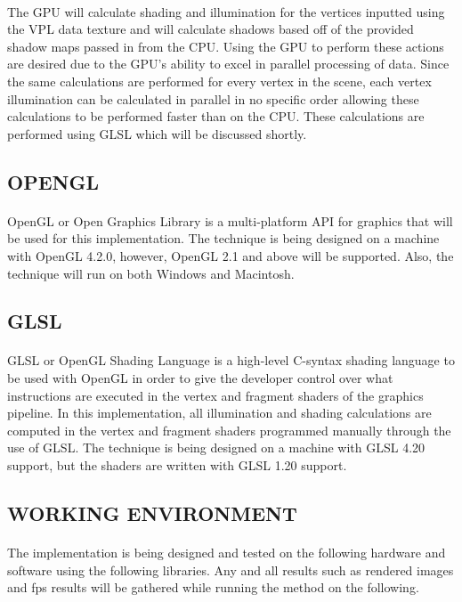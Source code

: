 \paragraph{}
The GPU will calculate shading and illumination for the vertices inputted using the VPL data texture and will calculate shadows based off of the provided shadow maps passed in from the CPU.  Using the GPU to perform these actions are desired due to the GPU's ability to excel in parallel processing of data.  Since the same calculations are performed for every vertex in the scene, each vertex illumination can be calculated in parallel in no specific order allowing these calculations to be performed faster than on the CPU.  These calculations are performed using GLSL which will be discussed shortly.

\subsection{OPENGL}
\paragraph{}
OpenGL or Open Graphics Library is a multi-platform API for graphics that will be used for this implementation.  The technique is being designed on a machine with OpenGL 4.2.0, however, OpenGL 2.1 and above will be supported.  Also, the technique will run on both Windows and Macintosh.

\subsection{GLSL}
\paragraph{}
GLSL or OpenGL Shading Language is a high-level C-syntax shading language to be used with OpenGL in order to give the developer control over what instructions are executed in the vertex and fragment shaders of the graphics pipeline.  In this implementation, all illumination and shading calculations are computed in the vertex and fragment shaders programmed manually through the use of GLSL.  The technique is being designed on a machine with GLSL 4.20 support, but the shaders are written with GLSL 1.20 support.

\subsection{WORKING ENVIRONMENT}
\paragraph{}
The implementation is being designed and tested on the following hardware and software using the following libraries.  Any and all results such as rendered images and fps results will be gathered while running the method on the following.

